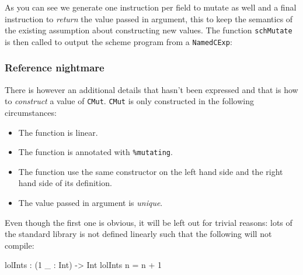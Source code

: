 \documentclass[
]{article}
\newenvironment{Shaded}{}{}
\newcommand{\DataTypeTok}[1]{\textcolor[rgb]{0.56,0.13,0.00}{#1}}
\newcommand{\DecValTok}[1]{\textcolor[rgb]{0.25,0.63,0.44}{#1}}
\newcommand{\FunctionTok}[1]{\textcolor[rgb]{0.02,0.16,0.49}{#1}}
\newcommand{\NormalTok}[1]{#1}
\newcommand{\OperatorTok}[1]{\textcolor[rgb]{0.40,0.40,0.40}{#1}}
\newcommand{\OtherTok}[1]{\textcolor[rgb]{0.00,0.44,0.13}{#1}}
\providecommand{\tightlist}{%
  \setlength{\itemsep}{0pt}\setlength{\parskip}{0pt}}
\begin{document}
As you can see we generate one instruction per field to mutate as well
and a final instruction to \emph{return} the value passed in argument,
this to keep the semantics of the existing assumption about constructing
new values. The function \texttt{schMutate} is then called to output the
scheme program from a \texttt{NamedCExp}:

\begin{Shaded}
\end{Shaded}

\hypertarget{reference-nightmare}{%
\subsubsection{Reference nightmare}\label{reference-nightmare}}

There is however an additional details that hasn't been expressed and
that is how to \emph{construct} a value of \texttt{CMut}. \texttt{CMut}
is only constructed in the following circumstances:

\begin{itemize}
\tightlist
\item
  The function is linear.
\item
  The function is annotated with \texttt{\%mutating}.
\item
  The function use the same constructor on the left hand side and the
  right hand side of its definition.
\item
  The value passed in argument is \emph{unique}.
\end{itemize}

Even though the first one is obvious, it will be left out for trivial
reasons: lots of the standard library is not defined linearly such that
the following will not compile:

\begin{Shaded}
\begin{Highlighting}[]
\NormalTok{lolInts }\OperatorTok{:}\NormalTok{ (}\DecValTok{1}\NormalTok{ \_ }\OperatorTok{:} \DataTypeTok{Int}\NormalTok{) }\OtherTok{{-}\textgreater{}} \DataTypeTok{Int}
\NormalTok{lolInts n }\OtherTok{=}\NormalTok{ n }\OperatorTok{+} \DecValTok{1}
\end{Highlighting}
\end{Shaded}
\end{document}
